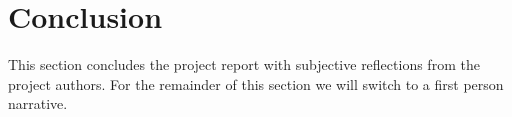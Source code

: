 
\section{Conclusion}
\label{sec:conclusion}

This section concludes the project report with subjective reflections from the project authors. For the remainder of this section we will switch to a first person narrative.






